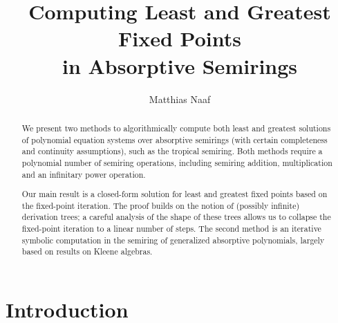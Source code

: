 \documentclass[english,runningheads,a4paper,envcountsame]{llncs}
\begin{document}
\title{Computing Least and Greatest Fixed Points\\ in Absorptive Semirings}

\author{Matthias Naaf}

\maketitle



\begin{abstract}
We present two methods to algorithmically compute both least and greatest solutions
of polynomial equation systems over absorptive semirings (with certain completeness and continuity assumptions), such as the tropical semiring.
Both methods require a polynomial number of semiring operations,
including semiring addition, multiplication and an infinitary power operation.

Our main result is a closed-form solution for least and greatest fixed points based on the fixed-point iteration.
The proof builds on the notion of (possibly infinite) derivation trees;
a careful analysis of the shape of these trees allows us to collapse
the fixed-point iteration to a linear number of steps.
The second method is an iterative symbolic computation in the semiring of generalized absorptive polynomials, largely based on results on Kleene algebras.
\end{abstract}





\section{Introduction}
\end{document}
